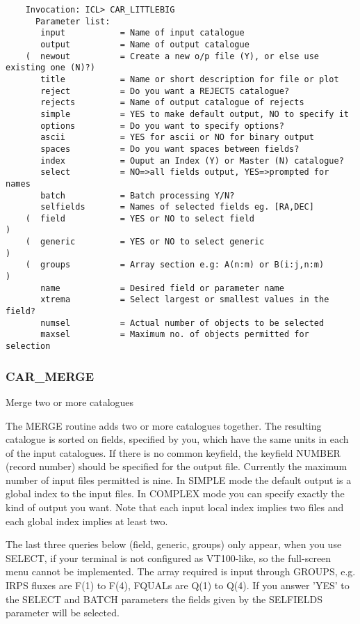 \begin{verbatim}
    Invocation: ICL> CAR_LITTLEBIG
      Parameter list:
       input           = Name of input catalogue
       output          = Name of output catalogue
    (  newout          = Create a new o/p file (Y), or else use existing one (N)?)
       title           = Name or short description for file or plot
       reject          = Do you want a REJECTS catalogue?
       rejects         = Name of output catalogue of rejects
       simple          = YES to make default output, NO to specify it
       options         = Do you want to specify options?
       ascii           = YES for ascii or NO for binary output
       spaces          = Do you want spaces between fields?
       index           = Ouput an Index (Y) or Master (N) catalogue?
       select          = NO=>all fields output, YES=>prompted for names
       batch           = Batch processing Y/N?
       selfields       = Names of selected fields eg. [RA,DEC]
    (  field           = YES or NO to select field                               )
    (  generic         = YES or NO to select generic                             )
    (  groups          = Array section e.g: A(n:m) or B(i:j,n:m)                 )
       name            = Desired field or parameter name
       xtrema          = Select largest or smallest values in the field?
       numsel          = Actual number of objects to be selected
       maxsel          = Maximum no. of objects permitted for selection
\end{verbatim}

\subsubsection{CAR\_MERGE}

Merge two or more catalogues

The MERGE routine adds two or more catalogues together.  
The resulting catalogue is sorted on fields, specified by you, which
have the same units in each of the input catalogues.
If there is no common keyfield, the keyfield NUMBER (record number) should 
be specified for the output file.
Currently the maximum number of input files permitted is nine.
In SIMPLE mode the default output is a global index to the input files.
In COMPLEX mode you can specify exactly the kind of output you want.
Note that each input local index implies two files and each global index
implies at least two.

The last three queries below (field, generic, groups) only appear, when you use
SELECT, if your terminal is not configured as VT100-like, so the full-screen 
menu cannot be implemented.
The array required is input through GROUPS, e.g. IRPS fluxes are F(1) to 
F(4), FQUALs are Q(1) to Q(4).
If you answer 'YES' to the SELECT and BATCH parameters the fields given by the
SELFIELDS parameter will be selected.

